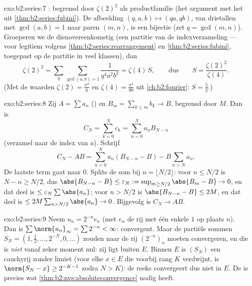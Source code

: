 \begin{solution}{exo:b2:series:7}
: begrensd door $\zeta(2)^2$ als productfamilie
(het argument met het  uit
\cref{thm:b2:series:fubini}). De afbeelding $(q, a, b) \mapsto
(qa, qb)$, van drietallen met $\gcd(a, b) = 1$ naar paren $(m,
n)$, is een bijectie (zet $q = \gcd(m,n)$). Groeperen we de
 dienovereenkomstig (een partitie van de
indexverzameling --- voor  legitiem volgens
\cref{thm:b2:series:rearrangement} en
\cref{thm:b2:series:fubini}, toegepast op de partitie in 
veel klassen), dan
\[
\zeta(2)^2 = \sum_{q} \sum_{\gcd(a,b)=1} \frac{1}{q^4 a^2 b^2}
= \zeta(4)\, S,
\qquad\text{dus}\qquad
S = \frac{\zeta(2)^2}{\zeta(4)} .
\]
(Met de waarden $\zeta(2) = \frac{\pi^2}{6}$ en $\zeta(4) =
\frac{\pi^4}{90}$ uit \cref{ch:b2:fourier}: $S = \frac{5}{2}$.)
\end{solution}

\begin{solution}{exo:b2:series:8}
Zij $A = \sum a_n$ () en $B_m = \sum_{k\leq m} b_k \to B$,
begrensd door $M$. Dan is
\[
C_N = \sum_{k=0}^{N} c_k = \sum_{n=0}^{N} a_n B_{N-n}
\]
(verzamel naar de index van $a$). Schrijf
\[
C_N - AB = \sum_{n=0}^{N} a_n (B_{N-n} - B) - B\sum_{n > N} a_n .
\]
De laatste term gaat naar $0$. Splits de som bij $n = \lfloor N/2
\rfloor$: voor $n \leq N/2$ is $N - n \geq N/2$, dus
$\abs{B_{N-n} - B} \leq \varepsilon_N := \sup_{m \geq N/2}\abs{B_m
- B} \to 0$, en dat deel is $\leq \varepsilon_N \sum\abs{a_n}$;
voor $n > N/2$ is $\abs{B_{N-n} - B} \leq 2M$, en dat deel is $\leq
2M \sum_{n > N/2} \abs{a_n} \to 0$. Bijgevolg is $C_N \to AB$.
\end{solution}

\begin{solution}{exo:b2:series:9}
Neem $u_n = 2^{-n} e_n$ (met $e_n$ de rij met één enkele $1$ op
plaats $n$). Dan is $\sum \norm{u_n}_\infty = \sum 2^{-n} <
\infty$:  convergent. Maar de partiële sommen $S_N = (1,
\tfrac12, \dots, 2^{-N}, 0, \dots)$ zouden naar de rij
$(2^{-n})_n$ moeten convergeren, en die is \emph{niet} vanaf zeker
moment nul: zij ligt buiten $E$. Binnen $E$ is $(S_N)$ een
cauchyrij zonder limiet (voor elke $x \in E$ die voorbij rang $K$
verdwijnt, is $\norm{S_N - x} \geq 2^{-K-1}$ zodra $N > K$): de
reeks convergeert dus niet in $E$. De  is precies wat
\cref{thm:b2:nvs:absoluteconvergence} nodig heeft.
\end{solution}

